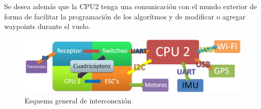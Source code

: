 \documentclass[main]{subfiles}
\begin{document}
Se desea adem\'as que la CPU2 tenga una comunicaci\'on con el mundo exterior de forma de facilitar la programaci\'on de los algor\'itmos y de modificar o agregar waypoints durante el vuelo.\\ 

\begin{figure}[h!]
  \centering
  \includegraphics[width=1\textwidth]{./pics_general/diagrama_gral.png}
  \caption{Esquema general de interconexi\'on}
  \label{fig:esquema_gral}
\end{figure}
\end{document}
